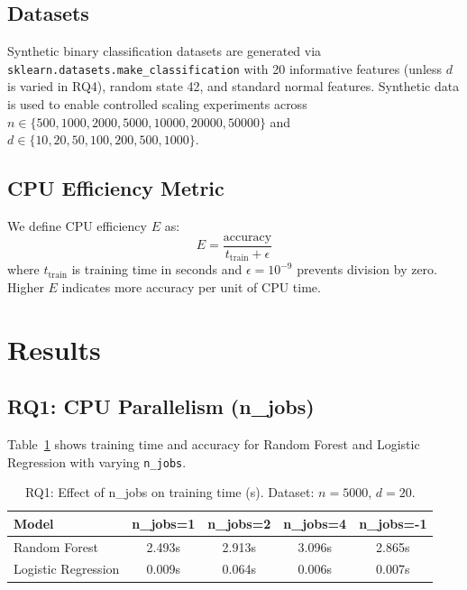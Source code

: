 \documentclass[10pt,twocolumn]{article}
\begin{document}
\subsection{Datasets}
Synthetic binary classification datasets are generated via 
\texttt{sklearn.datasets.make\_classification} with 20 informative features 
(unless $d$ is varied in RQ4), random state 42, and standard normal features.
Synthetic data is used to enable controlled scaling experiments across 
$n \in \{500, 1000, 2000, 5000, 10000, 20000, 50000\}$ and 
$d \in \{10, 20, 50, 100, 200, 500, 1000\}$.

\subsection{CPU Efficiency Metric}

We define CPU efficiency $E$ as:
\begin{equation}
E = \frac{\text{accuracy}}{t_{\text{train}} + \epsilon}
\label{eq:efficiency}
\end{equation}
where $t_{\text{train}}$ is training time in seconds and 
$\epsilon = 10^{-9}$ prevents division by zero.
Higher $E$ indicates more accuracy per unit of CPU time.

\section{Results}

\subsection{RQ1: CPU Parallelism (n\_jobs)}

Table~\ref{tab:parallelism} shows training time and accuracy for Random Forest 
and Logistic Regression with varying \texttt{n\_jobs}.

\begin{table}[h]
\centering
\caption{RQ1: Effect of n\_jobs on training time (s). Dataset: $n=5000$, $d=20$.}
\label{tab:parallelism}
\small
\begin{tabular}{lcccc}
\toprule
\textbf{Model} & \textbf{n\_jobs=1} & \textbf{n\_jobs=2} & \textbf{n\_jobs=4} & \textbf{n\_jobs=-1} \\
\midrule
Random Forest       & 2.493s & 2.913s & 3.096s & 2.865s \\
Logistic Regression & 0.009s & 0.064s & 0.006s & 0.007s \\
\bottomrule
\end{tabular}
\end{table}
\end{document}
